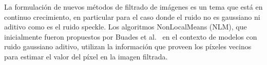 \documentclass[11pt]{article}
\begin{document}



La formulación de nuevos métodos de filtrado de imágenes es un tema que está en continuo crecimiento, en particular para el caso donde el ruido no es gaussiano ni aditivo como es el ruido speckle. Los algoritmos NonLocalMeans (NLM), que inicialmente fueron propuestos por Buades et al.~\cite{Buades2005} en el contexto de modelos con ruido gaussiano aditivo, utilizan la información que proveen los píxeles vecinos para estimar el valor del píxel en la imagen filtrada. 
%
\end{document}
